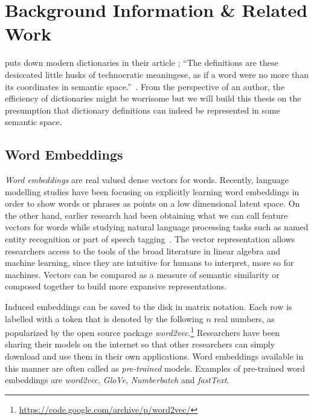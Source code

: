 
\chapter{Background Information \& Related Work}%
\label{chap:background_n_related}

\citeauthor{somers_youre_2014} puts down modern dictionaries in their article ;
\enquote{The definitions are these desiccated little husks of technocratic meaningese, as if a word were no more than its coordinates in semantic space.}~\cite{somers_youre_2014}.
From the perspective of an author, the efficiency of dictionaries might be worrisome but we will build this thesis on the presumption that dictionary definitions can indeed be represented in some semantic space.

\section{Word Embeddings}%
\label{sec:word_embeddings}


\emph{Word embeddings} are real valued dense vectors for words.
Recently, language modelling studies have been focusing on explicitly learning word embeddings in order to show words or phrases as points on a low dimensional latent space.
On the other hand, earlier research had been obtaining what we can call feature vectors for words while studying natural language processing tasks such as named entity recognition or part of speech tagging~\cite{almeida_word_2019, collobert_unified_2008}.
The vector representation allows researchers access to the tools of the broad literature in linear algebra and machine learning, since they are intuitive for humans to interpret, more so for machines.
Vectors can be compared as a measure of semantic similarity or composed together to build more expansive representations.

Induced embeddings can be saved to the disk in matrix notation.
Each row is labelled with a token that is denoted by the following $n$ real numbers, as popularized by the open source package \emph{word2vec}.\footnote{\url{https://code.google.com/archive/p/word2vec/}}
Researchers have been sharing their models on the internet so that other researchers can simply download and use them in their own applications.
Word embeddings available in this manner are often called as \emph{pre-trained} models.
Examples of pre-trained word embeddings are \emph{word2vec}, \emph{GloVe}, \emph{Numberbatch} and \emph{fastText}.

